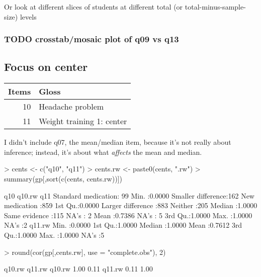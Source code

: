 \documentclass[11pt]{article}
\begin{document}
Or look at different slices of students at different total (or total-minus-sample-size) levels

\subsubsection{{\bfseries\sffamily TODO} crosstab/mosaic plot of q09 vs q13}
\label{sec-3-2-3}

\subsection{Focus on center}
\label{sec-3-3}
\begin{center}
\begin{tabular}{rl}
\textbf{Items} & \textbf{Gloss}\\
\hline
10 & Headache problem\\
11 & Weight training 1: center\\
\end{tabular}
\end{center}

I didn't include q07, the mean/median item, because it's not really about inference; instead, it's about what \emph{affects} the mean and median.
\begin{Schunk}
\begin{Sinput}
> cents <- c("q10", "q11")
> cents.rw <- paste0(cents, ".rw")
> summary(gp[,sort(c(cents, cents.rw))])
\end{Sinput}
\begin{Soutput}
                  q10          q10.rw                       q11     
 Standard medication: 99   Min.   :0.0000   Smaller difference:162  
 New medication     :859   1st Qu.:0.0000   Larger difference :883  
 Neither            :205   Median :1.0000   Same evidence     :115  
 NA's               :  2   Mean   :0.7386   NA's              :  5  
                           3rd Qu.:1.0000                           
                           Max.   :1.0000                           
                           NA's   :2                                
     q11.rw      
 Min.   :0.0000  
 1st Qu.:1.0000  
 Median :1.0000  
 Mean   :0.7612  
 3rd Qu.:1.0000  
 Max.   :1.0000  
 NA's   :5       
\end{Soutput}
\begin{Sinput}
> round(cor(gp[,cents.rw], use = "complete.obs"), 2)
\end{Sinput}
\begin{Soutput}
       q10.rw q11.rw
q10.rw   1.00   0.11
q11.rw   0.11   1.00
\end{Soutput}
\end{Schunk}
\end{document}
